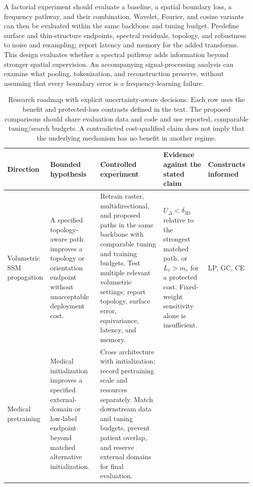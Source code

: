 \documentclass[5p,times,authoryear]{elsarticle}
\begin{document}
A factorial experiment should evaluate a baseline, a spatial boundary loss, a frequency pathway, and their combination. Wavelet, Fourier, and cosine variants can then be evaluated within the same backbone and tuning budget. Predefine surface and thin-structure endpoints, spectral residuals, topology, and robustness to noise and resampling; report latency and memory for the added transforms. This design evaluates whether a spectral pathway adds information beyond stronger spatial supervision. An accompanying signal-processing analysis can examine what pooling, tokenization, and reconstruction preserve, without assuming that every boundary error is a frequency-learning failure.
\begin{table}[!htbp]
\centering
\caption{Research roadmap with explicit uncertainty-aware decisions. Each row uses the benefit and protected-loss contrasts defined in the text. The proposed comparisons should share evaluation data and code and use reported, comparable tuning/search budgets. A contradicted cost-qualified claim does not imply that the underlying mechanism has no benefit in another regime.}
\label{tab:research_roadmap}
\scriptsize
\renewcommand{\arraystretch}{1.13}
\setlength{\tabcolsep}{3pt}
\begin{tabular}{>{\raggedright\arraybackslash}p{2.35cm}>{\raggedright\arraybackslash}p{3.25cm}>{\raggedright\arraybackslash}p{5.05cm}>{\raggedright\arraybackslash}p{4.0cm}>{\raggedright\arraybackslash}p{1.5cm}}
\toprule
\textbf{Direction} & \textbf{Bounded hypothesis} & \textbf{Controlled experiment} & \textbf{Evidence against the stated claim} & \textbf{Constructs informed} \\
\midrule
Volumetric SSM propagation
& A specified topology-aware path improves a topology or orientation endpoint without unacceptable deployment cost.
& Retrain raster, multidirectional, and proposed paths in the same backbone with comparable tuning and training budgets. Test multiple relevant volumetric settings; report topology, surface error, equivariance, latency, and memory.
& $U_\Delta<\delta_{\mathrm{3D}}$ relative to the strongest matched path, or $L_r>m_r$ for a protected cost. Fixed-weight sensitivity alone is insufficient.
& LP, GC, CE \\
\midrule
Medical pretraining
& Medical initialization improves a specified external-domain or low-label endpoint beyond matched alternative initialization.
& Cross architecture with initialization; record pretraining scale and resources separately. Match downstream data and tuning budgets, prevent patient overlap, and reserve external domains for final evaluation.

\end{tabular}
\end{table}
\end{document}
